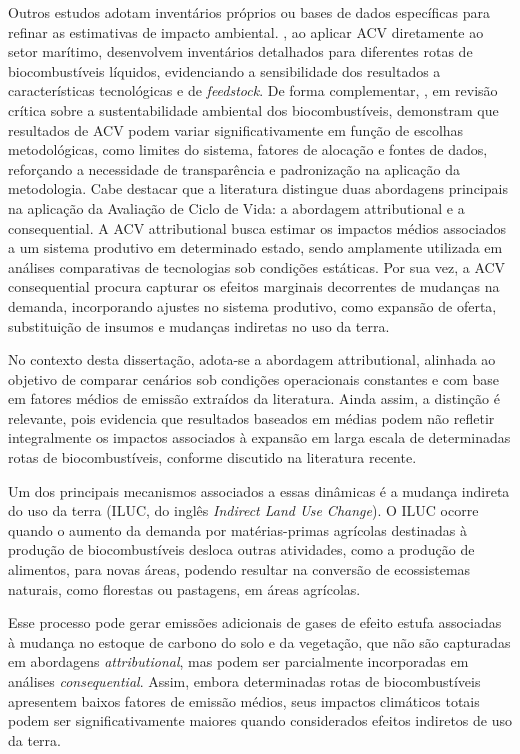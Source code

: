 Outros estudos adotam inventários próprios ou bases de dados específicas para refinar as estimativas de impacto ambiental. \citet{masum_comparing_2023}, ao aplicar \gls{ACV} diretamente ao setor marítimo, desenvolvem inventários detalhados para diferentes rotas de biocombustíveis líquidos, evidenciando a sensibilidade dos resultados a características tecnológicas e de \emph{feedstock}. De forma complementar, \citet{jeswani_environmental_2020}, em revisão crítica sobre a sustentabilidade ambiental dos biocombustíveis, demonstram que resultados de \gls{ACV} podem variar significativamente em função de escolhas metodológicas, como limites do sistema, fatores de alocação e fontes de dados, reforçando a necessidade de transparência e padronização na aplicação da metodologia.
Cabe destacar que a literatura distingue duas abordagens principais na aplicação da Avaliação de Ciclo de Vida: a abordagem attributional e a consequential. A ACV attributional busca estimar os impactos médios associados a um sistema produtivo em determinado estado, sendo amplamente utilizada em análises comparativas de tecnologias sob condições estáticas. Por sua vez, a ACV consequential procura capturar os efeitos marginais decorrentes de mudanças na demanda, incorporando ajustes no sistema produtivo, como expansão de oferta, substituição de insumos e mudanças indiretas no uso da terra.

No contexto desta dissertação, adota-se a abordagem attributional, alinhada ao objetivo de comparar cenários sob condições operacionais constantes e com base em fatores médios de emissão extraídos da literatura. Ainda assim, a distinção é relevante, pois evidencia que resultados baseados em médias podem não refletir integralmente os impactos associados à expansão em larga escala de determinadas rotas de biocombustíveis, conforme discutido na literatura recente.

Um dos principais mecanismos associados a essas dinâmicas é a mudança indireta do uso da terra (\gls{ILUC}, do inglês \emph{Indirect Land Use Change}). O ILUC ocorre quando o aumento da demanda por matérias-primas agrícolas destinadas à produção de biocombustíveis desloca outras atividades, como a produção de alimentos, para novas áreas, podendo resultar na conversão de ecossistemas naturais, como florestas ou pastagens, em áreas agrícolas.

Esse processo pode gerar emissões adicionais de gases de efeito estufa associadas à mudança no estoque de carbono do solo e da vegetação, que não são capturadas em abordagens \emph{attributional}, mas podem ser parcialmente incorporadas em análises \emph{consequential}. Assim, embora determinadas rotas de biocombustíveis apresentem baixos fatores de emissão médios, seus impactos climáticos totais podem ser significativamente maiores quando considerados efeitos indiretos de uso da terra.

